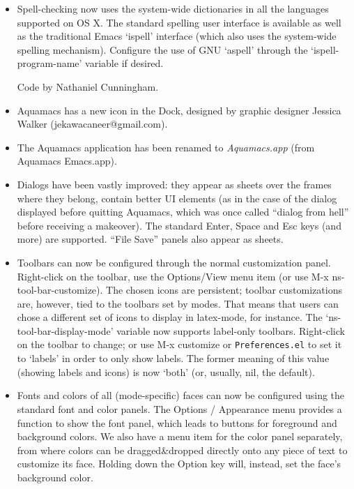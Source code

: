 \begin{itemize}
\item Spell-checking now uses the system-wide dictionaries in all the languages supported on OS X.  The standard spelling user interface is available as well as the traditional Emacs `ispell' interface (which also uses the system-wide spelling mechanism).  Configure the use of GNU `aspell' through the `ispell-program-name' variable if desired.

Code by Nathaniel Cunningham.

\item Aquamacs has a new icon in the Dock, designed by graphic designer Jessica Walker (jekawacaneer@gmail.com).

\item The Aquamacs application has been renamed to \emph{Aquamacs.app} (from Aquamacs Emacs.app).

\item Dialogs have been vastly improved: they appear as sheets over the frames where they belong, contain better UI elements (as in the case of the dialog displayed before quitting Aquamacs, which was once called ``dialog from hell'' before receiving a makeover).  The standard Enter, Space and Esc keys (and more) are supported.  ``File Save'' panels also appear as sheets.

\item Toolbars can now be configured through the normal customization panel.  Right-click on the toolbar, use the Options/View menu item (or use M-x ns-tool-bar-customize).  The chosen icons are persistent; toolbar customizations are, however, tied to the toolbars set by modes.  That means that users can chose a different set of icons to display in latex-mode, for instance.
The `ns-tool-bar-display-mode' variable now supports label-only toolbars.  Right-click on the toolbar to change; or use M-x customize or {\tt Preferences.el} to set it to `labels' in order to only show labels.  The former meaning of this value (showing labels and icons) is now `both' (or, usually, nil, the default).

\item Fonts and colors of all (mode-specific) faces can now be configured using the standard font and color panels.  The Options / Appearance menu provides a function to show the font panel, which leads to buttons for foreground and background colors.   We also have a menu item for the color panel separately, from where colors can be dragged\&dropped directly onto any piece of text to customize its face.  Holding down the Option key will, instead, set the face's background color.


\end{itemize}
